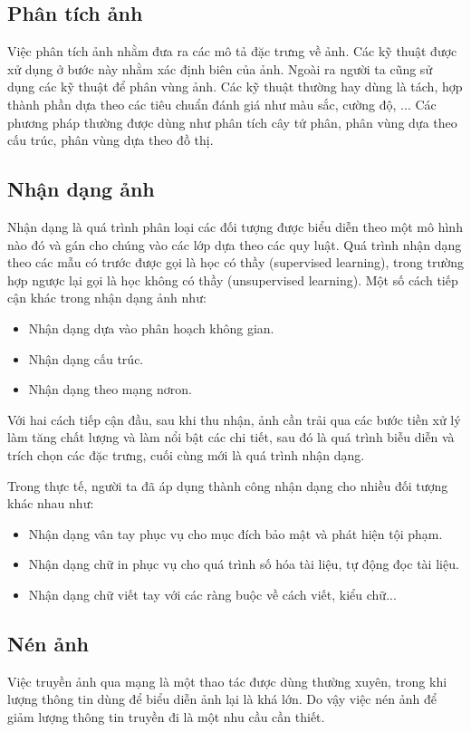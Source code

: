 \documentclass[12pt, oneside, a4paper]{book}
\begin{document}
\subsection{Phân tích ảnh}
Việc phân tích ảnh nhằm đưa ra các mô tả đặc trưng về ảnh. Các kỹ thuật được xử dụng ở bước này nhằm xác định biên của ảnh. Ngoài ra người ta cũng sử dụng các kỹ thuật để phân vùng ảnh. Các kỹ thuật thường hay dùng là tách, hợp thành phần dựa theo các tiêu chuẩn đánh giá như màu sắc, cường độ, ... Các phương pháp thường được dùng như phân tích cây tứ phân, phân vùng dựa theo cấu trúc, phân vùng dựa theo đồ thị.
\subsection{Nhận dạng ảnh}
Nhận dạng là quá trình phân loại các đối tượng được biểu diễn theo một mô hình nào đó và gán cho chúng vào các lớp dựa theo các quy luật. Quá trình nhận dạng theo các mẫu có trước được gọi là học có thầy (supervised learning), trong trường hợp ngược lại gọi là học không có thầy (unsupervised learning). Một số cách tiếp cận khác trong nhận dạng ảnh như: 
\begin{itemize}
\item Nhận dạng dựa vào phân hoạch không gian.
\item Nhận dạng  cấu trúc.
\item Nhận dạng theo mạng nơron.
\end{itemize}
Với hai cách tiếp cận đầu, sau khi thu nhận, ảnh cần trải qua các bước tiền xử lý làm tăng chất lượng và làm nổi bật các chi tiết, sau đó là quá trình biễu diễn và trích chọn các đặc trưng, cuối cùng mới là quá trình nhận dạng.

Trong thực tế, người ta đã áp dụng thành công nhận dạng cho nhiều đối tượng khác nhau như: 

\begin{itemize}
\item Nhận dạng vân tay phục vụ cho mục đích bảo mật và phát hiện tội phạm.
\item Nhận dạng chữ in phục vụ  cho quá trình số hóa tài liệu, tự động đọc tài liệu.
\item Nhận dạng chữ viết tay với các ràng buộc về cách viết, kiểu chữ... 
\end{itemize}
\subsection{Nén ảnh}
Việc truyền ảnh qua mạng là một thao tác được dùng thường xuyên, trong khi lượng thông tin dùng để biểu diễn ảnh lại là khá lớn. Do vậy việc nén ảnh để giảm lượng thông tin truyền đi là một nhu cầu cần thiết.
\end{document}
